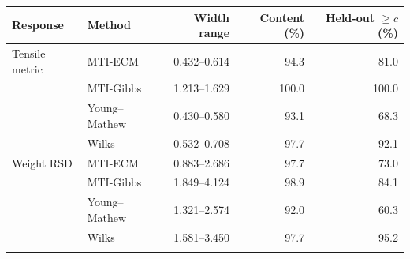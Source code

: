 \begin{tabular}{@{}llrrr@{}}
\toprule
Response & Method & Width range & Content (\%) & Held-out $\ge c$ (\%)\\
\midrule
Tensile metric & MTI-ECM & 0.432--0.614 & 94.3 & 81.0\\
 & MTI-Gibbs & 1.213--1.629 & 100.0 & 100.0\\
 & Young--Mathew & 0.430--0.580 & 93.1 & 68.3\\
 & Wilks & 0.532--0.708 & 97.7 & 92.1\\
\addlinespace[0.3em]
Weight RSD & MTI-ECM & 0.883--2.686 & 97.7 & 73.0\\
 & MTI-Gibbs & 1.849--4.124 & 98.9 & 84.1\\
 & Young--Mathew & 1.321--2.574 & 92.0 & 60.3\\
 & Wilks & 1.581--3.450 & 97.7 & 95.2\\
\addlinespace[0.3em]
\bottomrule
\end{tabular}
